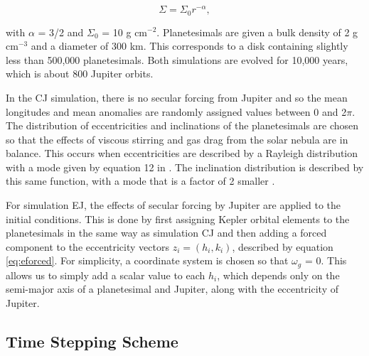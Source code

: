 \documentclass[twocolumn]{aastex62}
\begin{document}
\begin{equation}\label{eq:surf_den}
	\Sigma = \Sigma_{0} r^{-\alpha},
\end{equation}

\noindent with $\alpha$ = 3/2 and $\Sigma_{0}$ = 10 g cm$^{-2}$. Planetesimals are given a bulk density of 2 g cm$^{-3}$ and a diameter of 300 km. This corresponds to a disk containing slightly less than 500,000 planetesimals. Both simulations are evolved for 10,000 years, which is about 800 Jupiter orbits.

In the CJ simulation, there is no secular forcing from Jupiter and so the mean longitudes and mean anomalies are randomly assigned values between 0 and 2$\pi$. The distribution of eccentricities and inclinations of the planetesimals are chosen so that the effects of viscous stirring and gas drag from the solar nebula are in balance. This occurs when eccentricities are described by a Rayleigh distribution with a mode given by equation 12 in \citet{2002ApJ...581..666K}. The inclination distribution is described by this same function, with a mode that is a factor of 2 smaller \citep{1993MNRAS.263..875I}.

For simulation EJ, the effects of secular forcing by Jupiter are applied to the initial conditions. This is done by first assigning Kepler orbital elements to the planetesimals in the same way as simulation CJ and then adding a forced component to the eccentricity vectors $z_{i} = \left( h_{i}, k_{i} \right)$, described by equation \ref{eq:eforced}. For simplicity, a coordinate system is chosen so that $\omega_{g}$ = 0. This allows us to simply add a scalar value to each $h_{i}$, which depends only on the semi-major axis of a planetesimal and Jupiter, along with the eccentricity of Jupiter.

\subsection{Time Stepping Scheme}\label{sec:timestep}
\end{document}
